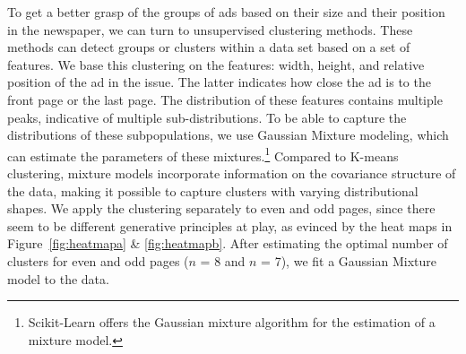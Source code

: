 \documentclass[USenglish]{article}
\begin{document}
To get a better grasp of the groups of ads based on their size and their position in the newspaper, we can turn to unsupervised clustering methods. These methods can detect groups or clusters within a data set based on a set of features. We base this clustering on the features: width, height, and relative position of the ad in the issue. The latter indicates how close the ad is to the front page or the last page. The distribution of these features contains multiple peaks, indicative of multiple sub-distributions. To be able to capture the distributions of these subpopulations, we use Gaussian Mixture modeling, which can estimate the parameters of these mixtures.\footnote{Scikit-Learn offers the Gaussian mixture algorithm for the estimation of a mixture model.} Compared to K-means clustering, mixture models incorporate information on the covariance structure of the data, making it possible to capture clusters with varying distributional shapes. We apply the clustering separately to even and odd pages, since there seem to be different generative principles at play, as evinced by the heat maps in Figure~\ref{fig:heatmapa} \& \ref{fig:heatmapb}. After estimating the optimal number of clusters for even and odd pages ($n$ = 8 and $n$ = 7), we fit a Gaussian Mixture model to the data.
\end{document}

